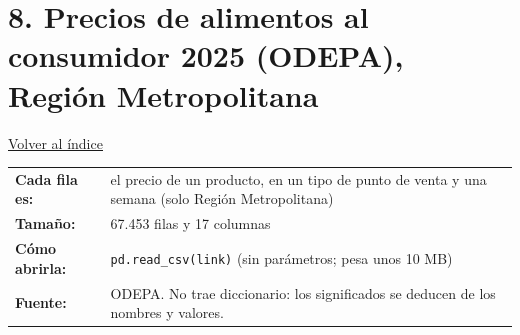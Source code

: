 \documentclass[10.5pt]{article}
\begin{document}
\section*{8. Precios de alimentos al consumidor 2025 (ODEPA), Región Metropolitana}
\vspace{-6pt}\hfill{\small\hyperlink{indice}{\textcolor{azuloscuro}{\underline{Volver al índice}}}}\par\vspace{2pt}
\begin{tabularx}{\linewidth}{@{}l X@{}}\textbf{Cada fila es:} & el precio de un producto, en un tipo de punto de venta y una semana (solo Región Metropolitana) \\\textbf{Tamaño:} & 67.453 filas y 17 columnas \\\textbf{Cómo abrirla:} & \texttt{pd.read\_\allowbreak{}csv(link)} (sin parámetros; pesa unos 10 MB) \\\textbf{Fuente:} & ODEPA. No trae diccionario: los significados se deducen de los nombres y valores. \\\end{tabularx}
\vspace{6pt}
\end{document}
